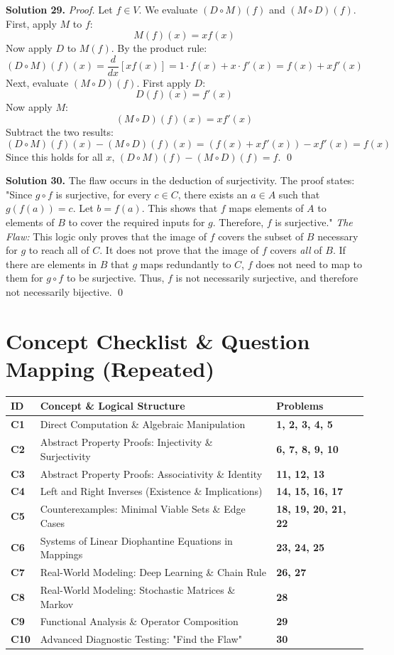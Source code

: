 \documentclass[11pt, letterpaper]{article}
\theoremstyle{definition}
\theoremstyle{remark}
\begin{document}
\textbf{Solution 29.}
\textit{Proof.} Let $f \in V$. We evaluate $(D \circ M)(f)$ and $(M \circ D)(f)$.
First, apply $M$ to $f$:
\[
M(f)(x) = x f(x)
\]
Now apply $D$ to $M(f)$. By the product rule:
\[
(D \circ M)(f)(x) = \frac{d}{dx}[x f(x)] = 1 \cdot f(x) + x \cdot f'(x) = f(x) + x f'(x)
\]
Next, evaluate $(M \circ D)(f)$. First apply $D$:
\[
D(f)(x) = f'(x)
\]
Now apply $M$:
\[
(M \circ D)(f)(x) = x f'(x)
\]
Subtract the two results:
\[
(D \circ M)(f)(x) - (M \circ D)(f)(x) = (f(x) + x f'(x)) - x f'(x) = f(x)
\]
Since this holds for all $x$, $(D \circ M)(f) - (M \circ D)(f) = f$.
\qed

\textbf{Solution 30.}
The flaw occurs in the deduction of surjectivity. The proof states: "Since $g \circ f$ is surjective, for every $c \in C$, there exists an $a \in A$ such that $g(f(a)) = c$. Let $b = f(a)$. This shows that $f$ maps elements of $A$ to elements of $B$ to cover the required inputs for $g$. Therefore, $f$ is surjective."
\textit{The Flaw:} This logic only proves that the image of $f$ covers the subset of $B$ necessary for $g$ to reach all of $C$. It does not prove that the image of $f$ covers \textit{all} of $B$. If there are elements in $B$ that $g$ maps redundantly to $C$, $f$ does not need to map to them for $g \circ f$ to be surjective. Thus, $f$ is not necessarily surjective, and therefore not necessarily bijective.
\qed

\newpage

\section{Concept Checklist \& Question Mapping (Repeated)}

\renewcommand{\arraystretch}{1.5}
\begin{tabularx}{\textwidth}{>{\bfseries}l X >{\bfseries}l}
\toprule
ID & Concept \& Logical Structure & Problems \\
\midrule
C1 & Direct Computation \& Algebraic Manipulation & 1, 2, 3, 4, 5 \\
C2 & Abstract Property Proofs: Injectivity \& Surjectivity & 6, 7, 8, 9, 10 \\
C3 & Abstract Property Proofs: Associativity \& Identity & 11, 12, 13 \\
C4 & Left and Right Inverses (Existence \& Implications) & 14, 15, 16, 17 \\
C5 & Counterexamples: Minimal Viable Sets \& Edge Cases & 18, 19, 20, 21, 22 \\
C6 & Systems of Linear Diophantine Equations in Mappings & 23, 24, 25 \\
C7 & Real-World Modeling: Deep Learning \& Chain Rule & 26, 27 \\
C8 & Real-World Modeling: Stochastic Matrices \& Markov & 28 \\
C9 & Functional Analysis \& Operator Composition & 29 \\
C10 & Advanced Diagnostic Testing: "Find the Flaw" & 30 \\
\bottomrule
\end{tabularx}
\end{document}
